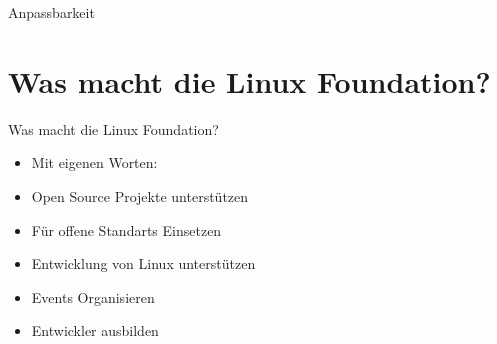\documentclass[11pt,aspectratio=169]{beamer}
\begin{document}
\begin{frame}{Anpassbarkeit}


\end{frame}
\section{Was macht die Linux Foundation?}

\begin{frame}{Was macht die Linux Foundation?}
	\begin{itemize}
		\item<1-> Mit eigenen Worten:\cite{About}
		\item<2-> Open Source Projekte unterstützen
		\item<3-> Für offene Standarts Einsetzen
		\item <4->Entwicklung von Linux unterstützen
		\item<5-> Events Organisieren\cite{Events}
		\item<6-> Entwickler ausbilden\cite{Training}
	\end{itemize}

\end{frame}
\end{document}
